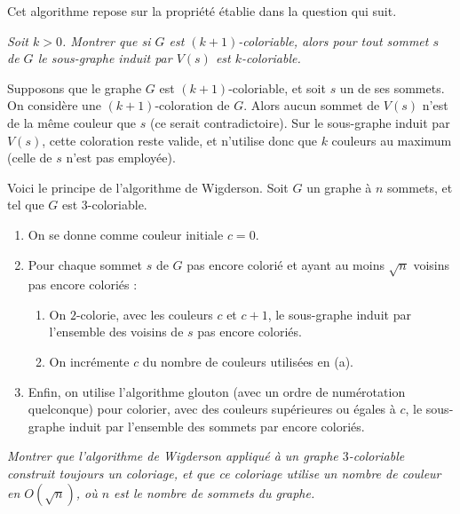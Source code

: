 Cet algorithme repose sur la propriété établie dans la question qui suit. 
\begin{Exercise}\it Soit $k >0$. Montrer que si $G$ est $(k+1)$-coloriable, alors pour tout sommet $s$ de $G$ le sous-graphe induit par $V(s)$ est $k$-coloriable. 
\end{Exercise}  
\begin{Answer}
Supposons que le graphe $G$ est $(k+1)$-coloriable, et soit $s$ un de ses sommets. On considère une $(k+1)$-coloration de $G$. Alors aucun sommet de $V(s)$ n'est de la même couleur que $s$ (ce serait contradictoire). Sur le sous-graphe induit par $V(s)$, cette coloration reste valide, et n'utilise donc que $k$ couleurs au maximum (celle de $s$ n'est pas employée).  
\end{Answer}
Voici le principe de l'algorithme de Wigderson. Soit $G$ un graphe à $n$ sommets, et tel que $G$ est $3$-coloriable.
\begin{enumerate}
    \item On se donne comme couleur initiale $c=0$. 
    \item Pour chaque sommet $s$ de $G$ pas encore colorié et ayant au moins $\sqrt{n}$ voisins pas encore coloriés : \begin{enumerate}
        \item On $2$-colorie, avec les couleurs $c$ et $c+1$, le sous-graphe induit par l'ensemble des voisins de $s$ pas encore coloriés. 
        \item On incrémente $c$ du nombre de couleurs utilisées en (a). 
        \end{enumerate}
    \item Enfin, on utilise l'algorithme glouton (avec un ordre de numérotation quelconque) pour colorier, avec des couleurs supérieures ou égales à $c$, le sous-graphe induit par l'ensemble des sommets par encore coloriés. 
\end{enumerate}
\begin{Exercise} \label{q:pptewigderson}\it Montrer que l'algorithme de Wigderson appliqué à un graphe $3$-coloriable construit toujours un coloriage, et que ce coloriage utilise un nombre de couleur en $O(\sqrt{n})$, où $n$ est le nombre de sommets du graphe. 
\end{Exercise}  

